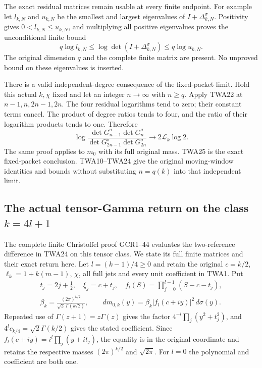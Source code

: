 The exact residual matrices remain usable at every finite endpoint.
For example let $l_{k,N}$ and $u_{k,N}$ be the smallest and largest
eigenvalues of $I+\Delta_{k,N}^\sigma$. Positivity gives
$0<l_{k,N}\le u_{k,N}$, and multiplying all positive eigenvalues
proves the unconditional finite bound
\[
q\log l_{k,N}\le\log\det(I+\Delta_{k,N}^\sigma)
                         \le q\log u_{k,N}.
\]
The original dimension $q$ and the complete finite matrix are
present. No unproved bound on these eigenvalues is inserted.

There is a valid independent-degree consequence of the fixed-packet
limit. Hold this actual $k,\chi$ fixed and let an integer $n\to\infty$
with $n\ge q$. Apply TWA22 at $n-1,n,2n-1,2n$. The four residual
logarithms tend to zero; their constant terms cancel. The product
of degree ratios tends to four, and the ratio of their logarithm
products tends to one. Therefore
\[
\log\frac{\det G_{n-1}^\sigma\det G_n^\sigma}
               {\det G_{2n-1}^\sigma\det G_{2n}^\sigma}
\longrightarrow2\mathcal L_k\log2.
\tag{TWA25}
\]
The same proof applies to $m_0$ with its full original mass.
TWA25 is the exact fixed-packet conclusion. TWA10--TWA24 give
the original moving-window identities and bounds without
substituting $n=q(k)$ into that independent limit.


\subsection{The actual tensor-Gamma return on the class $k=4l+1$}

The complete finite Christoffel proof GCR1--44 evaluates the
two-reference difference in TWA24 on this tensor class.
We state its full finite matrices and their exact return here.
Let $l=(k-1)/4\geq0$ and retain the original $c=k/2$,
$\ell_k=1+k(m-1)$, $\chi$, all full jets and every unit
coefficient in TWA1. Put
\[
\begin{gathered}
 t_j=2j+\tfrac12,\quad \xi_j=c+t_j,\quad
 f_l(S)=\prod_{j=0}^{l-1}(S-c-t_j),\\
 \beta_k=\frac{(2\pi)^{k/2}}{\sqrt2\,\Gamma(k/2)},\qquad
 dm_{0,k}(y)=\beta_k|f_l(c+iy)|^2\,d\sigma(y).
\end{gathered}\tag{TWA26}
\]
Repeated use of $\Gamma(z+1)=z\Gamma(z)$ gives the factor
$4^{-l}\prod_j(y^2+t_j^2)$, and
$4^lc_{k/4}=\sqrt2\Gamma(k/2)$ gives the stated coefficient.
Since $f_l(c+iy)=i^l\prod_j(y+it_j)$, the equality is in
the original coordinate and retains the respective masses
$(2\pi)^{k/2}$ and $\sqrt{2\pi}$. For $l=0$ the polynomial
and coefficient are both one.

